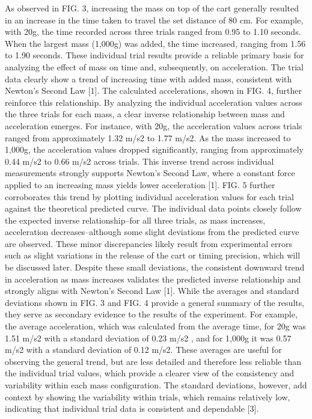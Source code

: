As observed in FIG. 3, increasing the mass on top of the cart generally resulted in an increase in the time taken to travel the set distance of 80 cm. For example, with 20g, the time recorded across three trials ranged from 0.95 to 1.10 seconds. When the largest mass (1,000g) was added, the time increased, ranging from 1.56 to 1.90 seconds. These individual trial results provide a reliable primary basis for analyzing the effect of mass on time and, subsequently, on acceleration. The trial data clearly show a trend of increasing time with added mass, consistent with Newton’s Second Law [1].
The calculated accelerations, shown in FIG. 4, further reinforce this relationship. By analyzing the individual acceleration values across the three trials for each mass, a clear inverse relationship between mass and acceleration emerges. For instance, with 20g, the acceleration values across trials ranged from approximately 1.32 m/s2 to 1.77 m/s2. As the mass increased to 1,000g, the acceleration values dropped significantly, ranging from approximately 0.44  m/s2 to 0.66  m/s2 across trials. This inverse trend across individual measurements strongly supports Newton’s Second Law, where a constant force applied to an increasing mass yields lower acceleration [1]. 
FIG. 5 further corroborates this trend by plotting individual acceleration values for each trial against the theoretical predicted curve. The individual data points closely follow the expected inverse relationship–for all three trials, as mass increases, acceleration decreases–although some slight deviations from the predicted curve are observed. These minor discrepancies likely result from experimental errors such as slight variations in the release of the cart or timing precision, which will be discussed later. Despite these small deviations, the consistent downward trend in acceleration as mass increases validates the predicted inverse relationship and strongly aligns with Newton’s Second Law [1].
While the averages and standard deviations shown in FIG. 3 and FIG. 4 provide a general summary of the results, they serve as secondary evidence to the results of the experiment. For example, the average acceleration, which was calculated from the average time, for 20g was 1.51 m/s2 with a standard deviation of 0.23 m/s2 , and for 1,000g it was 0.57 m/s2 with a standard deviation of 0.12 m/s2. These averages are useful for observing the general trend, but are less detailed and therefore less reliable than the individual trial values, which provide a clearer view of the consistency and variability within each mass configuration. The standard deviations, however, add context by showing the variability within trials, which remains relatively low, indicating that individual trial data is consistent and dependable [3].

